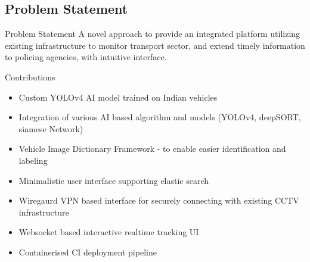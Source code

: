 \documentclass{beamer}
\begin{document}

	\subsection{Problem Statement}
	\begin{frame}{Problem Statement}
		A novel approach to provide an integrated platform utilizing existing infrastructure to monitor transport sector, and extend timely information to policing agencies, with intuitive interface.
	\end{frame}

	\begin{frame}{Contributions}
		\begin{itemize}
			\item Custom YOLOv4 AI model trained on Indian vehicles
			\item Integration of various AI based algorithm and models (YOLOv4, deepSORT, siamese Network)
   			\item Vehicle Image Dictionary Framework - to enable easier identification and labeling 
			\item Minimalistic user interface supporting elastic search
			\item Wiregaurd VPN based interface for securely connecting with existing CCTV infrastructure
   			\item Websocket based interactive realtime tracking UI 
			\item Containerised CI deployment pipeline 
		\end{itemize}
	\end{frame}
	
\end{document}
